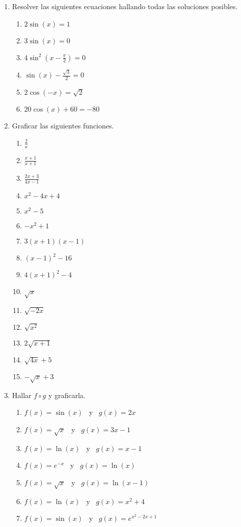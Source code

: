 \documentclass[a4paper]{article}
\newcommand{\exercise}{\item}
\begin{document}
\begin{enumerate}
	\exercise Resolver las siguientes ecuaciones hallando todas las soluciones posibles.
	\begin{multicols}{3}
	\begin{enumerate} [label=(\alph*)]
		\item $2\sin(x)=1$
		\item $3\sin(x)=0$
		\item $4\sin^{2}\left(x-\frac{\pi}{2}\right)=0$
		\item $\sin(x)-\frac{\sqrt{3}}{2}=0$
		\item $2\cos(-x)=\sqrt{2}$
		\item $20\cos(x)+60=-80$
	\end{enumerate}
	\end{multicols}

	\exercise Graficar las siguientes funciones.
	\begin{multicols}{3}
	\begin{enumerate} [label=(\alph*)]
		\item $\displaystyle\frac{2}{x}$
		\item $\displaystyle\frac{x+1}{x+1}$
		\item $\displaystyle\frac{2x+3}{4x-1}$
		\item $x^2-4x+4$
		\item $x^2-5$
		\item $-x^2+1$
		\item $3(x+1)(x-1)$
		\item $(x-1)^2-16$
		\item $4(x+1)^2-4$
		\item $\sqrt{x}$
		\item $\sqrt{-2x}$
		\item $\sqrt{x^2}$
		\item $2\sqrt{x+1}$
		\item $\sqrt{4x}+5$
		\item $-\sqrt{x}+3$
	\end{enumerate}
	\end{multicols}

	\exercise Hallar $f \circ g$ y graficarla.
	\begin{enumerate} [label=(\alph*)]
		\item $f(x)=\sin(x)$ ~y~ $g(x)=2x$
		\item $f(x)=\sqrt{x}$ ~y~ $g(x)=3x-1$
		\item $f(x)=\ln(x)$ ~y~ $g(x)=x-1$
		\item $f(x)=\displaystyle{e^{-x}}$ ~y~ $g(x)=\ln(x)$
		\item $f(x)=\sqrt{x}$ ~y~ $g(x)=\ln(x-1)$
		\item $f(x)=\ln(x)$ ~y~ $g(x)=x^2+4$
		\item $f(x)=\sin(x)$ ~y~ $g(x)=\displaystyle{e^{x^2-2x+1}}$
	\end{enumerate}


\end{enumerate}
\end{document}
